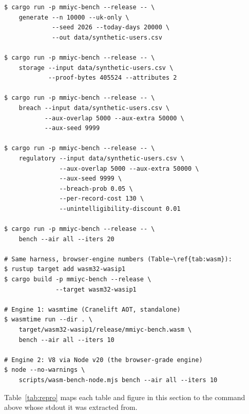 \documentclass[11pt,a4paper]{article}
\begin{document}
\begin{verbatim}
$ cargo run -p mmiyc-bench --release -- \
    generate --n 10000 --uk-only \
             --seed 2026 --today-days 20000 \
             --out data/synthetic-users.csv

$ cargo run -p mmiyc-bench --release -- \
    storage --input data/synthetic-users.csv \
            --proof-bytes 405524 --attributes 2

$ cargo run -p mmiyc-bench --release -- \
    breach --input data/synthetic-users.csv \
           --aux-overlap 5000 --aux-extra 50000 \
           --aux-seed 9999

$ cargo run -p mmiyc-bench --release -- \
    regulatory --input data/synthetic-users.csv \
               --aux-overlap 5000 --aux-extra 50000 \
               --aux-seed 9999 \
               --breach-prob 0.05 \
               --per-record-cost 130 \
               --unintelligibility-discount 0.01

$ cargo run -p mmiyc-bench --release -- \
    bench --air all --iters 20

# Same harness, browser-engine numbers (Table~\ref{tab:wasm}):
$ rustup target add wasm32-wasip1
$ cargo build -p mmiyc-bench --release \
              --target wasm32-wasip1

# Engine 1: wasmtime (Cranelift AOT, standalone)
$ wasmtime run --dir . \
    target/wasm32-wasip1/release/mmiyc-bench.wasm \
    bench --air all --iters 10

# Engine 2: V8 via Node v20 (the browser-grade engine)
$ node --no-warnings \
    scripts/wasm-bench-node.mjs bench --air all --iters 10
\end{verbatim}

Table~\ref{tab:repro} maps each table and figure in this
section to the command above whose stdout it was extracted from.
\end{document}
